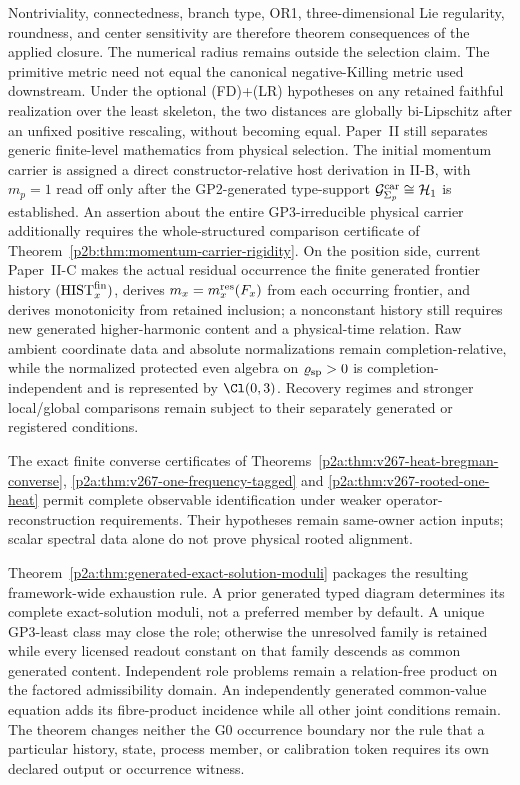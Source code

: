 \documentclass[12pt,a4paper]{article}
\begin{document}
Nontriviality, connectedness, branch type, OR1, three-dimensional Lie
regularity, roundness, and center sensitivity are therefore theorem
consequences of the applied closure.  The numerical radius remains outside
the selection claim.  The primitive metric need not equal the
canonical negative-Killing metric used downstream.  Under the optional (FD)+(LR) hypotheses on any retained faithful realization
over the least skeleton, the two distances are
globally bi-Lipschitz after an unfixed positive rescaling, without becoming
equal.  Paper~II still separates generic finite-level mathematics from physical
selection.  The initial momentum carrier is assigned a direct
constructor-relative host derivation in II-B, with \(m_p=1\) read off only
after the GP2-generated type-support \(\mathcal G^{\rm car}_{\Sigma_p}
\cong\mathcal H_1\) is established.  An assertion about the entire
GP3-irreducible physical carrier additionally requires the
whole-structured comparison certificate of
Theorem~\ref{p2b:thm:momentum-carrier-rigidity}.  On the position side, current
Paper~II-C makes the actual residual occurrence the finite generated frontier
history \((\mathrm{HIST}_x^{\rm fin})\), derives
\(m_x=m_x^{\rm res}(F_x)\) from each occurring frontier, and derives
monotonicity from retained inclusion; a nonconstant history still requires
new generated higher-harmonic content and a physical-time relation.  Raw
ambient coordinate data and absolute normalizations remain
completion-relative, while the normalized protected even algebra on
\(\varrho_{\rm sp}>0\) is completion-independent and is represented by
\(\Cl(0,3)\).  Recovery regimes and stronger local/global comparisons remain
subject to their separately generated or registered conditions.

The exact finite converse certificates of
Theorems~\ref{p2a:thm:v267-heat-bregman-converse},
\ref{p2a:thm:v267-one-frequency-tagged} and
\ref{p2a:thm:v267-rooted-one-heat} permit complete observable
identification under weaker operator-reconstruction requirements.
Their hypotheses remain same-owner action inputs; scalar spectral data
alone do not prove physical rooted alignment.

Theorem~\ref{p2a:thm:generated-exact-solution-moduli} packages the resulting
framework-wide exhaustion rule.  A prior generated typed diagram determines
its complete exact-solution moduli, not a preferred member by default.  A
unique GP3-least class may close the role; otherwise the unresolved family is
retained while every licensed readout constant on that family descends as
common generated content.  Independent role problems remain a relation-free
product on the factored admissibility domain. An independently generated
common-value equation adds its fibre-product incidence while all other joint
conditions remain.  The theorem changes neither the G0 occurrence
boundary nor the rule that a particular history, state, process member, or
calibration token requires its own declared output or occurrence witness.
\end{document}
